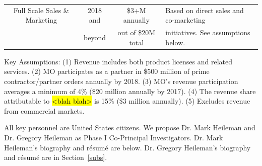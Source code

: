 \documentclass{sbir}
\begin{document}
\begin{table}
\begin{center}
\begin{tabular}{|cccl|}
   Full Scale Sales \& Marketing			&		2018 and 			& 	\$3+M annually			& Based on direct sales and co-marketing \\
   								& 		beyond			&	out of \$20M total		& initiatives. See assumptions below.	\\ \hline
 \end{tabular}
\end{center}
\vspace{-6pt}
{\small Key Assumptions: (1) Revenue includes both product licenses and related services. (2) MO participates as a partner in \$500 million of prime contractor/partner orders annually by 2018. (3) MO's revenue participation averages a minimum of 4\% (\$20 million annually by 2017). (4) The revenue share attributable to \hl{<blah blah>} is 15\% (\$3 million annually). (5) Excludes revenue from commercial markets.}
\end{table}

All key personnel are United States citizens. We propose Dr. Mark Heileman and Dr. Gregory Heileman as Phase I Co-Principal Investigators.  Dr. Mark Heileman's biography and r\'esum\'e are below. Dr. Gregory Heileman's biography and r\'esum\'e are in Section~\ref{subs}.
\begin{center}
\vspace{-12pt}
\end{center}
\end{document}
